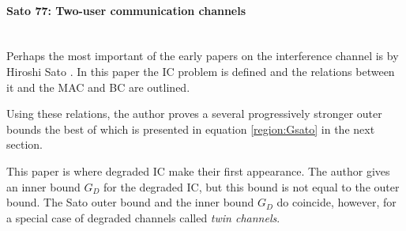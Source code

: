 \documentclass[aps,11pt,twoside,letterpaper]{article}
\begin{document}


            




        \paragraph{Sato 77: Two-user communication channels} \ \\

            Perhaps the most important of the early papers on the interference channel is 
            by Hiroshi Sato \cite{Sato77}.
            In this paper the IC problem is defined and the relations between it and the
            MAC and BC are outlined.
            
            Using these relations, the author proves a several progressively stronger 
            outer bounds the best of which is presented in equation \eqref{region:Gsato} in
            the next section.
            
            
            This paper is where degraded IC make their first appearance.
            The author gives an inner bound $G_D$ for the degraded IC,
            but this bound is not equal to the outer bound.
            The Sato outer bound and the inner bound $G_D$ do coincide,
            however, for a special case of degraded channels called \emph{twin channels}.
            
\end{document}
